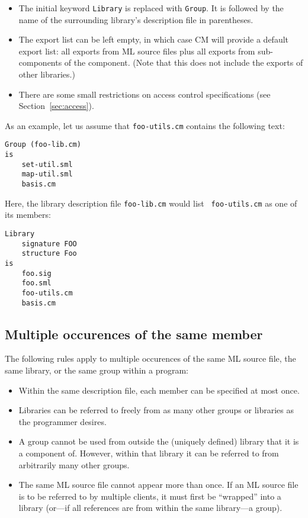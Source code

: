 \documentclass{article}
\begin{document}
\begin{itemize}
\item The initial keyword {\tt Library} is replaced with {\tt Group}.
It is followed by the name of the surrounding library's description
file in parentheses.
\item The export list can be left empty, in which case CM will
provide a default export list: all exports from ML source files plus
all exports from sub-components of the component.  (Note that this does
not include the exports of other libraries.)
\item There are some small restrictions on access control
specifications (see Section~\ref{sec:access}).
\end{itemize}

As an example, let us assume that {\tt foo-utils.cm} contains the
following text:

\begin{verbatim}
Group (foo-lib.cm)
is
    set-util.sml
    map-util.sml
    basis.cm
\end{verbatim}

Here, the library description file {\tt foo-lib.cm} would list {\tt
foo-utils.cm} as one of its members:

\begin{verbatim}
Library
    signature FOO
    structure Foo
is
    foo.sig
    foo.sml
    foo-utils.cm
    basis.cm
\end{verbatim}

\subsection{Multiple occurences of the same member}
\label{sec:multioccur}

The following rules apply to multiple occurences of the same ML source
file, the same library, or the same group within a program:

\begin{itemize}
\item Within the same description file, each member can be specified
at most once.
\item Libraries can be referred to freely from as many other groups or
libraries as the programmer desires.
\item A group cannot be used from outside the (uniquely defined)
library that it is a component of.  However, within that library it
can be referred to from arbitrarily many other groups.
\item The same ML source file cannot appear more than once.  If an ML
source file is to be referred to by multiple clients, it must first be
``wrapped'' into a library (or---if all references are from within the
same library---a group).
\end{itemize}
\end{document}
